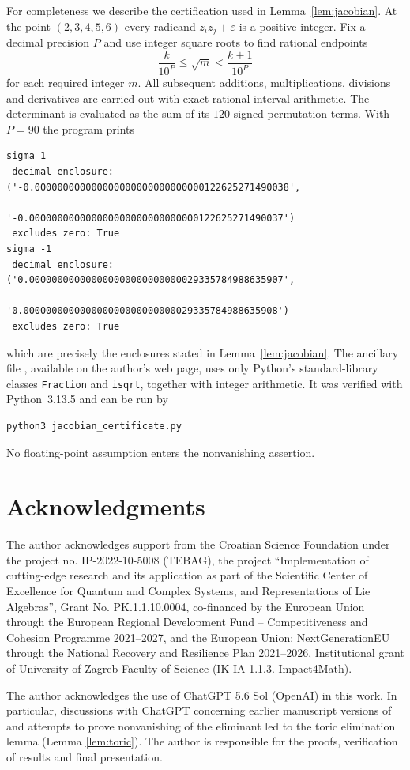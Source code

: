 \documentclass[11pt]{amsart}
\theoremstyle{remark}
\newcommand{\eps}{\varepsilon}
\begin{document}
For completeness we describe the certification used in
Lemma~\ref{lem:jacobian}. At the point $(2,3,4,5,6)$ every radicand
$z_i z_j+\eps$ is a positive integer. Fix a decimal precision $P$ and use
integer square roots to find rational endpoints
\[
 \frac{k}{10^P}\le\sqrt m<\frac{k+1}{10^P}
\]
for each required integer $m$. All subsequent additions, multiplications,
divisions and derivatives are carried out with exact rational interval
arithmetic. The determinant is evaluated as the sum of its $120$ signed
permutation terms. With $P=90$ the program prints
\begin{verbatim}
sigma 1
 decimal enclosure: ('-0.000000000000000000000000000000122625271490038',
                     '-0.000000000000000000000000000000122625271490037')
 excludes zero: True
sigma -1
 decimal enclosure: ('0.000000000000000000000000000029335784988635907',
                     '0.000000000000000000000000000029335784988635908')
 excludes zero: True
\end{verbatim}
which are precisely the enclosures stated in Lemma~\ref{lem:jacobian}.
The ancillary file , available on the author's web page, uses only Python's
standard-library classes \texttt{Fraction} and \texttt{isqrt}, together with
integer arithmetic. It was verified with Python~3.13.5 and can be run by
\begin{verbatim}
python3 jacobian_certificate.py
\end{verbatim}
No floating-point assumption enters the nonvanishing assertion.

\section*{Acknowledgments}
The author acknowledges support from
the Croatian Science Foundation under the
project no. IP-2022-10-5008 (TEBAG),
the project ``Implementation of cutting-edge research and its application as part of the
Scientific Center of Excellence for Quantum and Complex Systems, and Representations of Lie Algebras'', Grant No. PK.1.1.10.0004, co-financed by the European
Union through the European Regional Development Fund -- Competitiveness and
Cohesion Programme 2021--2027,
and the European Union:
NextGenerationEU through the National Recovery and Resilience Plan 2021--2026, Institutional grant of University of Zagreb Faculty of Science (IK IA 1.1.3. Impact4Math).

The author acknowledges the use of ChatGPT 5.6 Sol (OpenAI) in this work.
In particular, discussions with ChatGPT concerning earlier manuscript versions of \cite{DL}
and attempts to prove nonvanishing of the eliminant led to the toric elimination lemma (Lemma \ref{lem:toric}).
The author is responsible for the proofs, verification of results and final presentation.
\end{document}

